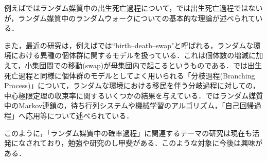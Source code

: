 \documentclass[dvipdfmx]{jsarticle}
\numberwithin{equation}{section}
\theoremstyle{definition}
\newcommand{\0}{\bm{0}}
\newcommand{\1}{\bm{1}}
\begin{document}
例えば\cite{Torrez}ではランダム媒質中の出生死亡過程について，\cite{Kawadu}では出生死亡過程ではないが，ランダム媒質中のランダムウォークについての基本的な理論が述べられている．

また，最近の研究は，例えば\cite{Kaakai}では``birth--death--swap"と呼ばれる，ランダムな環境における異種の個体群に関するモデルを扱っている．これは個体数の増減に加えて，小集団間での移動(swap)が母集団内で起こるというものである．\cite{Huang}では出生死亡過程と同様に個体群のモデルとしてよく用いられる「分枝過程(Branching Process)」について，ランダムな環境における移民を伴う分岐過程に対しての，中心極限定理の収束率に関するいくつかの結果を与えている．\cite{Lovasa}ではランダム媒質中のMarkov連鎖の，待ち行列システムや機械学習のアルゴリズム，「自己回帰過程」へ応用等について述べられている．

このように，「ランダム媒質中の確率過程」に関連するテーマの研究は現在も活発になされており，勉強や研究のし甲斐がある．このような対象に今後は興味がある．
\end{document}
